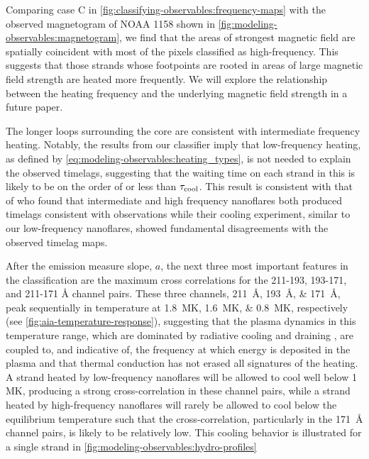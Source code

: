 Comparing case C in \autoref{fig:classifying-observables:frequency-maps} with the observed magnetogram of NOAA 1158 shown in \autoref{fig:modeling-observables:magnetogram}, we find that the areas of strongest magnetic field are spatially coincident with most of the pixels classified as high-frequency. This suggests that those strands whose footpoints are rooted in areas of large magnetic field strength are heated more frequently. We will explore the relationship between the heating frequency and the underlying magnetic field strength in a future paper.

The longer loops surrounding the core are consistent with intermediate frequency heating. Notably, the results from our classifier imply that low-frequency heating, as defined by \autoref{eq:modeling-observables:heating_types}, is not needed to explain the observed timelags, suggesting that the waiting time on each strand in this \AR{} is likely to be on the order of or less than $\tau_\textup{cool}$. This result is consistent with that of \citet{bradshaw_patterns_2016} who found that intermediate and high frequency nanoflares both produced timelags consistent with observations while their cooling experiment, similar to our low-frequency nanoflares, showed fundamental disagreements with the observed timelag maps.

After the emission measure slope, $a$, the next three most important features in the classification are the maximum cross correlations for the 211-193, 193-171, and 211-171 \si{\angstrom} channel pairs. These three channels, \SIlist{211;193;171}{\angstrom}, peak sequentially in temperature at \SIlist{1.8;1.6;0.8}{\mega\kelvin}, respectively (see \autoref{fig:aia-temperature-response}), suggesting that the plasma dynamics in this temperature range, which are dominated by radiative cooling and draining \citep[e.g.][]{bradshaw_cooling_2005,bradshaw_cooling_2010,bradshaw_new_2010}, are coupled to, and indicative of, the frequency at which energy is deposited in the plasma and that thermal conduction has not erased all signatures of the heating. A strand heated by low-frequency nanoflares will be allowed to cool well below 1 MK, producing a strong cross-correlation in these channel pairs, while a strand heated by high-frequency nanoflares will rarely be allowed to cool below the equilibrium temperature such that the cross-correlation, particularly in the \SI{171}{\angstrom} channel pairs, is likely to be relatively low. This cooling behavior is illustrated for a single strand in \autoref{fig:modeling-observables:hydro-profiles}

